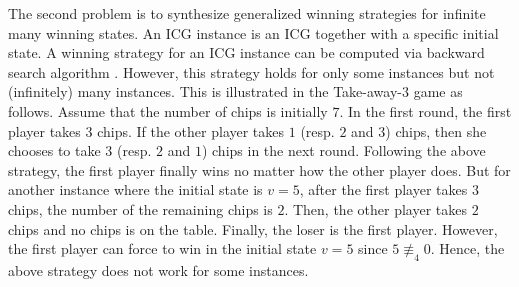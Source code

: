 \documentclass[review]{elsarticle}
\newcommand{\nmodulo}{\not \equiv}
\begin{document}
	The second problem is to synthesize generalized winning strategies for infinite many winning states.
	An ICG instance is an ICG together with a specific initial state.
	A winning strategy for an ICG instance can be computed via backward search algorithm \cite{JonZ2016}.
	However, this strategy holds for only some instances but not (infinitely) many instances.  
	This is illustrated in the Take-away-$3$ game as follows.
	Assume that the number of chips is initially $7$.
	In the first round, the first player takes $3$ chips.
	If the other player takes $1$ (resp. $2$ and $3$) chips, then she chooses to take $3$ (resp. $2$ and $1$) chips in the next round.
	Following the above strategy, the first player finally wins no matter how the other player does.
	But for another instance where the initial state is $v = 5$, after the first player takes $3$ chips, the number of the remaining chips is $2$.
	Then, the other player takes $2$ chips and no chips is on the table.
	Finally, the loser is the first player.	
	However, the first player can force to win in the initial state $v = 5$ since $5 \nmodulo_4 0$.
	Hence, the above strategy does not work for some instances.
	
%		
    

\end{document}
